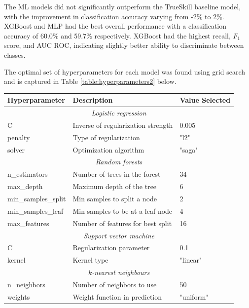 The ML models did not significantly outperform the TrueSkill baseline model, with the improvement in classification accuracy varying from -2\% to 2\%. XGBoost and MLP had the best overall performance with a classification accuracy of 60.0\% and 59.7\%  respectively. XGBoost had the highest recall, $F_1$ score, and AUC ROC, indicating slightly better ability to discriminate between classes.

\clearpage

The optimal set of hyperparameters for each model was found using grid search and is captured in Table \ref{table:hyperparameters2} below.

 \begin{table}[h]
	\centering
	\small
	\begin{adjustbox}{center}
		\begin{tabular}{|l|l|l|}
			\hline
			\rule{0pt}{2.5ex}\textbf{Hyperparameter} & \textbf{Description} & \textbf{Value Selected} \\
			\hline
			\multicolumn{3}{|c|}{\rule{0pt}{2.5ex}\textit{Logistic regression}} \\
			\hline
			C & Inverse of regularization strength & 0.005 \\
			penalty & Type of regularization & "l2" \\
			solver & Optimization algorithm & "saga" \\
			\hline
			\multicolumn{3}{|c|}{\rule{0pt}{2.5ex}\textit{Random forests}} \\
			\hline
			n\_estimators & Number of trees in the forest & 34 \\
			max\_depth & Maximum depth of the tree & 6 \\
			min\_samples\_split & Min samples to split a node & 2 \\
			min\_samples\_leaf & Min samples to be at a leaf node & 4 \\
			max\_features & Number of features for best split & 16 \\
			\hline
			\multicolumn{3}{|c|}{\rule{0pt}{2.5ex}\textit{Support vector machine}} \\
			\hline
			C & Regularization parameter & 0.1 \\
			kernel & Kernel type & "linear" \\
			\hline
			\multicolumn{3}{|c|}{\rule{0pt}{2.5ex}\textit{$k$-nearest neighbours}} \\
			\hline
			n\_neighbors & Number of neighbors to use & 50 \\
			weights & Weight function in prediction & "uniform" \\

\end{tabular}
\end{adjustbox}
\end{table}
